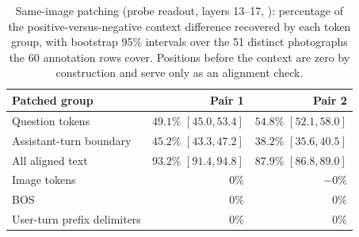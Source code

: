 \begin{table}[h]
  \caption{Same-image patching (probe readout, layers 13--17, \gemma{}): percentage of the positive-versus-negative context difference recovered by each token group, with bootstrap 95\% intervals over the 51 distinct photographs the 60 annotation rows cover. Positions before the context are zero by construction and serve only as an alignment check.}
  \label{tab:patching}
  \centering
  \small
  \begin{tabular}{lrr}
    \toprule
    Patched group & Pair 1 & Pair 2 \\
    \midrule
    Question tokens              & $49.1\%$ $[45.0, 53.4]$ & $54.8\%$ $[52.1, 58.0]$ \\
    Assistant-turn boundary      & $45.2\%$ $[43.3, 47.2]$ & $38.2\%$ $[35.6, 40.5]$ \\
    All aligned text             & $\mathbf{93.2\%}$ $[91.4, 94.8]$ & $\mathbf{87.9\%}$ $[86.8, 89.0]$ \\
    \midrule
    Image tokens                 & $0\%$  & $-0\%$ \\
    BOS                          & $0\%$  & $0\%$ \\
    User-turn prefix delimiters  & $0\%$  & $0\%$ \\
    \bottomrule
  \end{tabular}
\end{table}
